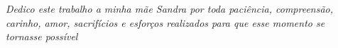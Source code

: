 \begin{dedicatoria}
	\vspace*{\fill}
	\centering
	\noindent
	\textit{Dedico este trabalho a minha mãe Sandra por toda paciência,  compreensão, carinho, amor, sacrifícios e esforços realizados para que esse momento se tornasse possível}
    \vspace*{\fill}
\end{dedicatoria}